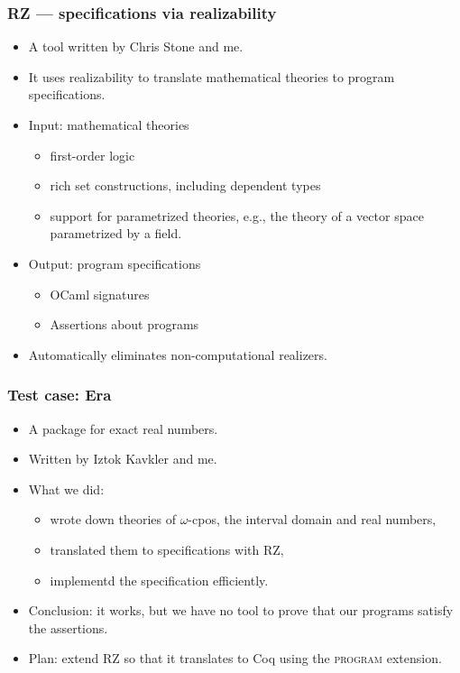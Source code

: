 \documentclass[t]{beamer}
\begin{document}
\begin{frame}
  \frametitle{RZ --- specifications via realizability}

  \begin{itemize}
  \item A tool written by Chris Stone and me.
  \item It uses realizability to translate mathematical theories to
    program specifications.
  \item Input: mathematical theories
    \begin{itemize}
    \item first-order logic
    \item rich set constructions, including dependent types
    \item support for parametrized theories, e.g., the theory of a
      vector space parametrized by a field.
    \end{itemize}
  \item Output: program specifications
    \begin{itemize}
    \item OCaml signatures
    \item Assertions about programs
    \end{itemize}
  \item Automatically eliminates non-computational realizers.
  \end{itemize}
\end{frame}

\begin{frame}
  \frametitle{Test case: Era}

  \begin{itemize}
  \item A package for exact real numbers.
  \item Written by Iztok Kavkler and me.
  \item What we did:
    \begin{itemize}
    \item wrote down theories of $\omega$-cpos,
      the interval domain and real numbers,
    \item translated them to specifications with RZ,
    \item implementd the specification efficiently.
    \end{itemize}
  \item Conclusion: it works, but we have no tool to prove that our
    programs satisfy the assertions.
  \item Plan: extend RZ so that it translates to Coq using the
    \textsc{program} extension.
  \end{itemize}
\end{frame}
\end{document}
